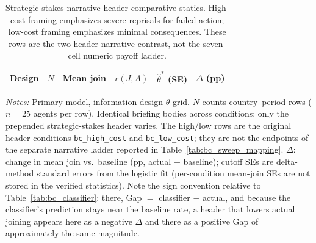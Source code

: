 \begin{table}[t]
\centering
\caption{Strategic-stakes narrative-header comparative statics. High-cost framing emphasizes severe reprisals for failed action; low-cost framing emphasizes minimal consequences. These rows are the two-header narrative contrast, not the seven-cell numeric payoff ladder.}
\label{tab:bc_statics}
\scriptsize
\setlength{\tabcolsep}{2pt}
\begin{tabular}{lccccc}
\toprule
Design & $N$ & Mean join & $r(J,A)$ & $\hat{\theta}^*$ (SE) & $\Delta$ (pp) \\
\midrule

\bottomrule
\end{tabular}
\begin{tablenotes}
\footnotesize\emph{Notes:} Primary model, information-design $\theta$-grid. $N$ counts country--period rows ($n = 25$ agents per row). Identical briefing bodies across conditions; only the prepended strategic-stakes header varies. The high/low rows are the original header conditions \texttt{bc\_high\_cost} and \texttt{bc\_low\_cost}; they are not the endpoints of the separate narrative ladder reported in Table~\ref{tab:bc_sweep_mapping}. $\Delta$: change in mean join vs.\ baseline (pp, actual $-$ baseline); cutoff SEs are delta-method standard errors from the logistic fit (per-condition mean-join SEs are not stored in the verified statistics). Note the sign convention relative to Table~\ref{tab:bc_classifier}: there, Gap $=$ classifier $-$ actual, and because the classifier's prediction stays near the baseline rate, a header that lowers actual joining appears here as a negative $\Delta$ and there as a positive Gap of approximately the same magnitude.
\end{tablenotes}
\end{table}
